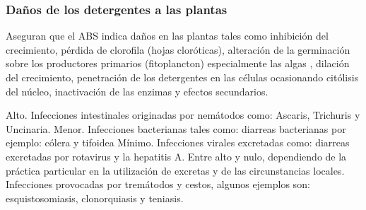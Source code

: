 \subsubsection{Daños de los detergentes a las plantas}
Aseguran que el ABS indica daños en las plantas tales como inhibición del crecimiento, pérdida de clorofila (hojas cloróticas), alteración de la germinación sobre los productores primarios (fitoplancton) especialmente las algas \cite{streitwieser1963isotope}, dilación del crecimiento, penetración de los detergentes en las células ocasionando citólisis del núcleo, inactivación de las enzimas y efectos secundarios.

Alto. Infecciones intestinales originadas por nemátodos como: Ascaris, Trichuris y Uncinaria.
Menor. Infecciones bacterianas tales  como: diarreas bacterianas por ejemplo: cólera y tifoidea
Mínimo. Infecciones virales excretadas como: diarreas excretadas por rotavirus y la hepatitis A.
Entre alto y nulo, dependiendo de la práctica particular en la utilización de excretas y de las circunstancias locales. Infecciones provocadas por tremátodos y cestos, algunos ejemplos son: esquistosomiasis, clonorquiasis y teniasis.
